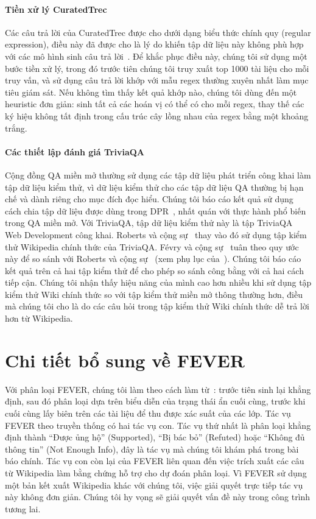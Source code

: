 \documentclass[10pt,letterpaper]{article}
\begin{document}
\paragraph{Tiền xử lý CuratedTrec}
Các câu trả lời của CuratedTrec được cho dưới dạng biểu thức chính quy (regular
expression), điều này đã được cho là lý do khiến tập dữ liệu này không phù hợp
với các mô hình sinh câu trả lời~\cite{b20}. Để khắc phục điều này, chúng tôi
sử dụng một bước tiền xử lý, trong đó trước tiên chúng tôi truy xuất top 1000
tài liệu cho mỗi truy vấn, và sử dụng câu trả lời khớp với mẫu regex thường
xuyên nhất làm mục tiêu giám sát. Nếu không tìm thấy kết quả khớp nào, chúng
tôi dùng đến một heuristic đơn giản: sinh tất cả các hoán vị có thể có cho mỗi
regex, thay thế các ký hiệu không tất định trong cấu trúc cây lồng nhau của
regex bằng một khoảng trắng.

\paragraph{Các thiết lập đánh giá TriviaQA}
Cộng đồng QA miền mở thường sử dụng các tập dữ liệu phát triển công khai làm
tập dữ liệu kiểm thử, vì dữ liệu kiểm thử cho các tập dữ liệu QA thường bị hạn
chế và dành riêng cho mục đích đọc hiểu. Chúng tôi báo cáo kết quả sử dụng cách
chia tập dữ liệu được dùng trong DPR~\cite{b26}, nhất quán với thực hành phổ
biến trong QA miền mở. Với TriviaQA, tập dữ liệu kiểm thử này là tập TriviaQA
Web Development công khai. Roberts và cộng sự~\cite{b52} thay vào đó sử dụng
tập kiểm thử Wikipedia chính thức của TriviaQA. Févry và cộng sự~\cite{b14}
tuân theo quy ước này để so sánh với Roberts và cộng sự~\cite{b52} (xem phụ lục
của~\cite{b14}). Chúng tôi báo cáo kết quả trên cả hai tập kiểm thử để cho phép
so sánh công bằng với cả hai cách tiếp cận. Chúng tôi nhận thấy hiệu năng của
mình cao hơn nhiều khi sử dụng tập kiểm thử Wiki chính thức so với tập kiểm thử
miền mở thông thường hơn, điều mà chúng tôi cho là do các câu hỏi trong tập
kiểm thử Wiki chính thức dễ trả lời hơn từ Wikipedia.

\section{Chi tiết bổ sung về FEVER}

Với phân loại FEVER, chúng tôi làm theo cách làm từ~\cite{b32}: trước tiên sinh
lại khẳng định, sau đó phân loại dựa trên biểu diễn của trạng thái ẩn cuối
cùng, trước khi cuối cùng lấy biên trên các tài liệu để thu được xác suất của
các lớp. Tác vụ FEVER theo truyền thống có hai tác vụ con. Tác vụ thứ nhất là
phân loại khẳng định thành ``Được ủng hộ'' (Supported), ``Bị bác bỏ'' (Refuted)
hoặc ``Không đủ thông tin'' (Not Enough Info), đây là tác vụ mà chúng tôi khám
phá trong bài báo chính. Tác vụ con còn lại của FEVER liên quan đến việc trích
xuất các câu từ Wikipedia làm bằng chứng hỗ trợ cho dự đoán phân loại. Vì FEVER
sử dụng một bản kết xuất Wikipedia khác với chúng tôi, việc giải quyết trực
tiếp tác vụ này không đơn giản. Chúng tôi hy vọng sẽ giải quyết vấn đề này
trong công trình tương lai.
\end{document}
